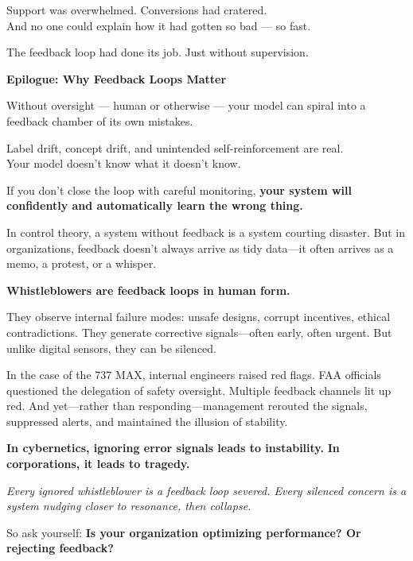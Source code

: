 Support was overwhelmed. Conversions had cratered.\\
And no one could explain how it had gotten so bad — so fast.

The feedback loop had done its job. Just without supervision.

\vspace{1em}
\textbf{Epilogue: Why Feedback Loops Matter}

Without oversight — human or otherwise — your model can spiral into a feedback chamber of its own mistakes.

Label drift, concept drift, and unintended self-reinforcement are real.\\
Your model doesn’t know what it doesn’t know.

If you don’t close the loop with careful monitoring, \textbf{your system will confidently and automatically learn the wrong thing.}



\begin{tcolorbox}[title=Sidebar: Whistleblowers as Rejected Feedback, colback=gray!10, colframe=black, fonttitle=\bfseries]

    In control theory, a system without feedback is a system courting disaster.  
    But in organizations, feedback doesn’t always arrive as tidy data—it often arrives as a memo, a protest, or a whisper.
    
    \textbf{Whistleblowers are feedback loops in human form.}
    
    They observe internal failure modes: unsafe designs, corrupt incentives, ethical contradictions. They generate corrective signals—often early, often urgent. But unlike digital sensors, they can be silenced.
    
    In the case of the 737 MAX, internal engineers raised red flags. FAA officials questioned the delegation of safety oversight. Multiple feedback channels lit up red.  
    And yet—rather than responding—management rerouted the signals, suppressed alerts, and maintained the illusion of stability.
    
    \textbf{In cybernetics, ignoring error signals leads to instability.}  
    \textbf{In corporations, it leads to tragedy.}
    
    \textit{Every ignored whistleblower is a feedback loop severed. Every silenced concern is a system nudging closer to resonance, then collapse.}
    
    So ask yourself:  
    \textbf{Is your organization optimizing performance? Or rejecting feedback?}
    
\end{tcolorbox}